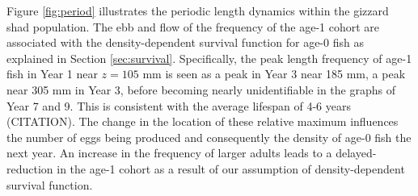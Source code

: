 \documentclass[preprint,review,12pt,authoryear]{elsarticle}
\begin{document}

Figure \ref{fig:period} illustrates the periodic length dynamics within the gizzard shad population.  
The ebb and flow of the frequency of the age-1 cohort are associated with the density-dependent survival function for age-0 fish as explained in Section \ref{sec:survival}.
Specifically, the peak length frequency of age-1 fish in Year 1 near $z = 105$ mm is seen as a peak in Year 3 near 185 mm, a peak near 305 mm in Year 3, before becoming nearly unidentifiable in the graphs of Year 7 and 9.  
This is consistent with the average lifespan of 4-6 years (CITATION). 
The change in the location of these relative maximum influences the number of eggs being produced and consequently the density of age-0 fish the next year. 
An increase in the frequency of larger adults leads to a delayed-reduction in the age-1 cohort as a result of our  assumption of density-dependent survival function.

%
\end{document}
